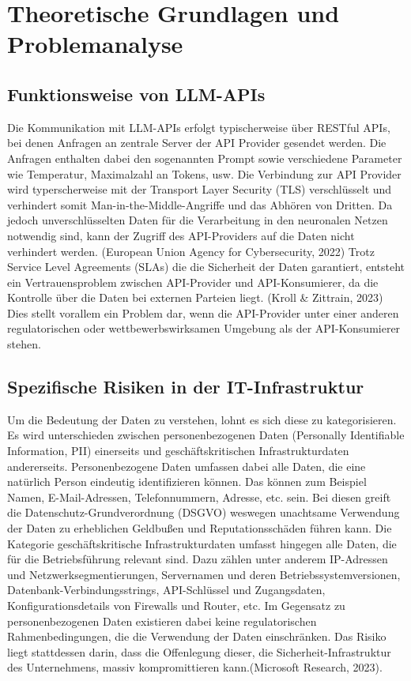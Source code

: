 
\chapter{Theoretische Grundlagen und Problemanalyse}

\section{Funktionsweise von LLM-APIs}

Die Kommunikation mit LLM-APIs erfolgt typischerweise über RESTful APIs, bei denen Anfragen an zentrale Server der API Provider gesendet werden.
Die Anfragen enthalten dabei den sogenannten Prompt sowie verschiedene Parameter wie Temperatur, Maximalzahl an Tokens, usw.
Die Verbindung zur API Provider wird typerscherweise mit der Transport Layer Security (TLS) verschlüsselt und verhindert somit
Man-in-the-Middle-Angriffe und das Abhören von Dritten.
Da jedoch unverschlüsselten Daten für die Verarbeitung in den neuronalen Netzen notwendig sind,
kann der Zugriff des API-Providers auf die Daten nicht verhindert werden. (European Union Agency for Cybersecurity, 2022)
Trotz Service Level Agreements (SLAs) die die Sicherheit der Daten garantiert, entsteht ein Vertrauensproblem zwischen API-Provider und API-Konsumierer,
da die Kontrolle über die Daten bei externen Parteien liegt. (Kroll \& Zittrain, 2023) Dies stellt vorallem ein Problem dar,
wenn die API-Provider unter einer anderen regulatorischen oder wettbewerbswirksamen Umgebung als der API-Konsumierer stehen.


\section{Spezifische Risiken in der IT-Infrastruktur}
Um die Bedeutung der Daten zu verstehen, lohnt es sich diese zu kategorisieren.
Es wird unterschieden zwischen personenbezogenen Daten (Personally Identifiable Information, PII) einerseits und
geschäftskritischen Infrastrukturdaten andererseits. Personenbezogene Daten umfassen dabei alle Daten, die eine natürlich Person eindeutig identifizieren können.
Das können zum Beispiel Namen, E-Mail-Adressen, Telefonnummern, Adresse, etc. sein. Bei diesen greift die Datenschutz-Grundverordnung (DSGVO)
weswegen unachtsame Verwendung der Daten zu erheblichen Geldbußen und Reputationsschäden führen kann.
Die Kategorie geschäftskritische Infrastrukturdaten umfasst hingegen alle Daten, die für die Betriebsführung relevant sind.
Dazu zählen unter anderem IP-Adressen und Netzwerksegmentierungen, Servernamen und deren Betriebssystemversionen, Datenbank-Verbindungsstrings,
API-Schlüssel und Zugangsdaten, Konfigurationsdetails von Firewalls und Router, etc.
Im Gegensatz zu personenbezogenen Daten existieren dabei keine regulatorischen Rahmenbedingungen, die die Verwendung der Daten einschränken.
Das Risiko liegt stattdessen darin, dass die Offenlegung dieser, die Sicherheit-Infrastruktur des Unternehmens, massiv
kompromittieren kann.(Microsoft Research, 2023).